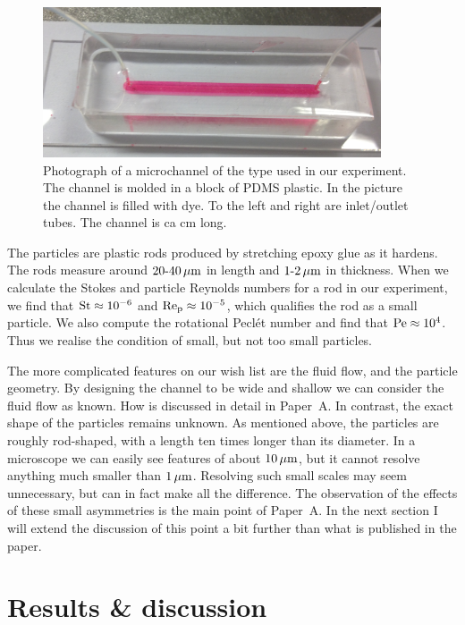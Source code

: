 \documentclass[thesis.tex]{subfiles}
\begin{document}
\begin{figure}
\includegraphics[width=10cm]{figs/expsetup_hires.png}%
\caption{\label{fig:exp_setup} Photograph of a microchannel of the type used in our experiment. The channel is molded in a block of PDMS plastic. In the picture the channel is filled with dye. To the left and right are inlet/outlet tubes. The channel is ca \unit[5]{cm} long.}%
\end{figure}

The particles are plastic rods produced by stretching epoxy glue as it hardens. The rods measure around $\unit[20\textrm{-}40]{\mu m}$ in length and $\unit[1\textrm{-}2]{\mu m}$ in thickness. When we calculate the Stokes and particle Reynolds numbers for a rod in our experiment, we find that $\mbox{St} \approx 10^{-6}$ and $\mbox{Re}_{\mathrm p} \approx 10^{-5}$, which qualifies the rod as a small particle. We also compute the rotational Pecl\'et number and find that $\mbox{Pe}\approx10^{4}$. Thus we realise the condition of small, but not too small particles. 

The more complicated features on our wish list are the fluid flow, and the particle geometry. By designing the channel to be wide and shallow we can consider the fluid flow as known. How is discussed in detail in Paper~A. In contrast, the exact shape of the particles remains unknown. As mentioned above, the particles are roughly rod-shaped, with a length ten times longer than its diameter. In a microscope we can easily see features of about $\unit[10]{\mu m}$, but it cannot resolve anything much smaller than $\unit[1]{\mu m}$. Resolving such small scales may seem unnecessary, but can in fact make all the difference. The observation of the effects of these small asymmetries is the main point of Paper~A. In the next section I will extend the discussion of this point a bit further than what is published in the paper.

\section{Results \& discussion}
\end{document}
